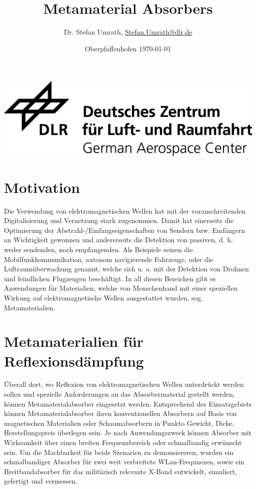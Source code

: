 \documentclass[a4paper,12pt]{scrartcl}  %
\title{Metamaterial Absorbers}
\author[1]{Dr. Stefan Umrath, \href{mailto:Stefan.Umrath@dlr.de}{Stefan.Umrath@dlr.de}}
\affil[1]{German Aerospace Center (DLR)}
\date{Oberpfaffenhofen \today{} \vspace{3cm}}
\begin{document}
\maketitle
\begin{center}
\includegraphics[width= 0.75\linewidth]{../media/DLR_Logo_engl_schwarz.jpg}
\end{center}

\newpage
\tableofcontents 
\newpage
\section{Motivation}
Die Verwendung von elektromagnetischen Wellen hat mit der voranschreitenden 
Digitalisierung und Vernetzung stark zugenommen. Damit hat einerseits die 
Optimierung der Abstrahl-/Emfangseigenschaften von Sendern bzw. Emfängern 
an Wichtigkeit gewonnen und andererseits die Detektion von passiven, d. h. 
weder sendenden, noch empfangenden. Als Beispiele seinen die Mobilfunkkommunikation, 
autonom navigierende Fahrzeuge, oder die Luftraumüberwachung genannt, welche
sich u. a. mit der Detektion von Drohnen und feindlichen Flugzeugen beschäftigt. 
In all diesen Bereichen gibt es Anwendungen für Materialien, welche von 
Menschenhand mit einer speziellen Wirkung auf elektromagnetische Wellen
ausgestattet wurden, sog. Metamaterialien.

\section{Metamaterialien für Reflexionsdämpfung}
Überall dort, wo Reflexion von elektromagnetischen Wellen unterdrückt werden sollen
und spezielle Anforderungen an das Absorbermaterial gestellt werden, können 
Metamaterialabsorber eingesetzt werden. 
Entsprechend des Einsatzgebiets können Metamaterialabsorber ihren konventionellen
Absorbern auf Basis von magnetischen Materialien oder Schaumabsorbern in Punkto Gewicht, Dicke, Herstellungspreis überlegen sein. Je nach Anwendungszweck können Absorber mit
Wirksamkeit über einen breiten Frequenzbereich oder schmalbandig erwünscht sein. 
Um die Machbarkeit für beide Szenarien zu demonsiereren, wurden ein schmalbandiger Absorber für zwei weit verbreitete WLan-Frequnezen, sowie ein Breitbandabsorber für das militärisch relevante X-Band entwickelt, simuliert, gefertigt und vermessen.
\end{document}
